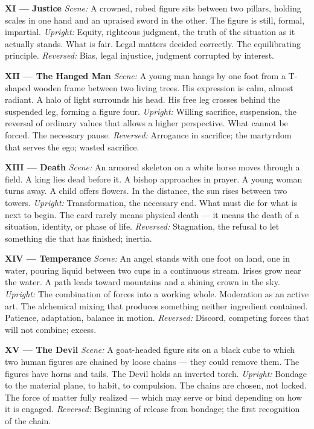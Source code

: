 \textbf{XI --- Justice} \emph{Scene:} A crowned, robed figure sits between two pillars, holding scales in one hand and an upraised sword in the other. The figure is still, formal, impartial. \emph{Upright:} Equity, righteous judgment, the truth of the situation as it actually stands. What is fair. Legal matters decided correctly. The equilibrating principle. \emph{Reversed:} Bias, legal injustice, judgment corrupted by interest.

\textbf{XII --- The Hanged Man} \emph{Scene:} A young man hangs by one foot from a T-shaped wooden frame between two living trees. His expression is calm, almost radiant. A halo of light surrounds his head. His free leg crosses behind the suspended leg, forming a figure four. \emph{Upright:} Willing sacrifice, suspension, the reversal of ordinary values that allows a higher perspective. What cannot be forced. The necessary pause. \emph{Reversed:} Arrogance in sacrifice; the martyrdom that serves the ego; wasted sacrifice.

\textbf{XIII --- Death} \emph{Scene:} An armored skeleton on a white horse moves through a field. A king lies dead before it. A bishop approaches in prayer. A young woman turns away. A child offers flowers. In the distance, the sun rises between two towers. \emph{Upright:} Transformation, the necessary end. What must die for what is next to begin. The card rarely means physical death --- it means the death of a situation, identity, or phase of life. \emph{Reversed:} Stagnation, the refusal to let something die that has finished; inertia.

\textbf{XIV --- Temperance} \emph{Scene:} An angel stands with one foot on land, one in water, pouring liquid between two cups in a continuous stream. Irises grow near the water. A path leads toward mountains and a shining crown in the sky. \emph{Upright:} The combination of forces into a working whole. Moderation as an active art. The alchemical mixing that produces something neither ingredient contained. Patience, adaptation, balance in motion. \emph{Reversed:} Discord, competing forces that will not combine; excess.

\textbf{XV --- The Devil} \emph{Scene:} A goat-headed figure sits on a black cube to which two human figures are chained by loose chains --- they could remove them. The figures have horns and tails. The Devil holds an inverted torch. \emph{Upright:} Bondage to the material plane, to habit, to compulsion. The chains are chosen, not locked. The force of matter fully realized --- which may serve or bind depending on how it is engaged. \emph{Reversed:} Beginning of release from bondage; the first recognition of the chain.

